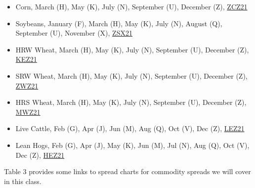 \documentclass[
  letterpaper,
  DIV=11,
  numbers=noendperiod]{scrreprt}
\begin{document}
\begin{itemize}
\item
  Corn, March (H), May (K), July (N), September (U), December (Z),
  \href{https://www.barchart.com/futures/quotes/ZCZ21/overview}{ZCZ21}
\item
  Soybeans, January (F), March (H), May (K), July (N), August (Q),
  September (U), November (X),
  \href{https://www.barchart.com/futures/quotes/ZSX21/overview}{ZSX21}
\item
  HRW Wheat, March (H), May (K), July (N), September (U), December (Z),
  \href{https://www.barchart.com/futures/quotes/KEZ21/overview}{KEZ21}
\item
  SRW Wheat, March (H), May (K), July (N), September (U), December (Z),
  \href{https://www.barchart.com/futures/quotes/ZWZ21/overview}{ZWZ21}
\item
  HRS Wheat, March (H), May (K), July (N), September (U), December (Z),
  \href{https://www.barchart.com/futures/quotes/MWZ21/overview}{MWZ21}
\item
  Live Cattle, Feb (G), Apr (J), Jun (M), Aug (Q), Oct (V), Dec (Z),
  \href{https://www.barchart.com/futures/quotes/LEZ21/overview}{LEZ21}
\item
  Lean Hogs, Feb (G), Apr (J), May (K), Jun (M), Jul (N), Aug (Q), Oct
  (V), Dec (Z),
  \href{httphttps://www.barchart.com/futures/quotes/HEZ21/overview}{HEZ21}
\end{itemize}

Table 3 provides some links to spread charts for commodity spreads we
will cover in this class.
\end{document}
